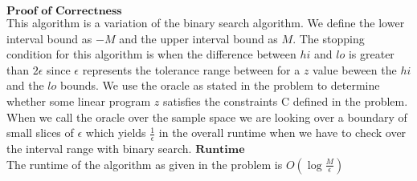 \documentclass[addpoints, 11pt]{exam}
\begin{document}
\begin{questions}
  $\textbf{Proof of Correctness}$ \\
  This algorithm is a variation of the binary search algorithm. We define the lower interval bound as $-M$ and
  the upper interval bound as $M$. The stopping condition for this algorithm is when the difference between $hi$ and $lo$ is greater than $2\epsilon$
  since $\epsilon$ represents the tolerance range between for a $z$ value beween the $hi$ and the $lo$ bounds. We use the oracle as stated in the problem
  to determine whether some linear program $z$ satisfies the constraints C defined in the problem. When we call the oracle over the sample space we are looking 
  over a boundary of small slices of $\epsilon$ which yields $\frac{1}{\epsilon}$ in the overall runtime when we have to check over the interval range with binary search. 
  $\textbf{Runtime}$ \\
  The runtime of the algorithm as given in the problem is $O(\log \frac{M}{\epsilon})$

\end{questions}
\end{document}
